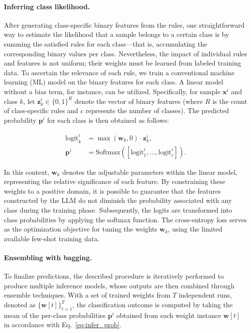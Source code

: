 \paragraph{Inferring class likelihood.} After generating class-specific binary features from the rules, one straightforward way to estimate the likelihood that a sample belongs to a certain class is by summing the satisfied rules for each class—that is, accumulating the corresponding binary values per class. Nevertheless, the impact of individual rules and features is not uniform; their weights must be learned from labeled training data. To ascertain the relevance of each rule, we train a conventional machine learning (ML) model on the binary features for each class. A linear model without a bias term, for instance, can be utilized. Specifically, for sample $\mathbf{x}^i$ and class $k$, let $\mathbf{z}_k^i \in \{0, 1\}^R$ denote the vector of binary features (where $R$ is the count of class-specific rules and $c$ represents the number of classes). The predicted probability $\mathbf{p}^i$ for each class is then obtained as follows:

\begin{align}
\text{logit}_k^i &= \max(\mathbf{w}_k, 0) \cdot \mathbf{z}_k^i, \nonumber \\
\mathbf{p}^i &= \text{Softmax}({[\text{logit}_{1}^i, ..., \text{logit}_{c}^i]}). \label{eq:infer_prob}
\end{align}

In this context, $\mathbf{w}_k$ denotes the adjustable parameters within the linear model, representing the relative significance of each feature. By constraining these weights to a positive domain, it is possible to guarantee that the features constructed by the LLM do not diminish the probability associated with any class during the training phase. Subsequently, the logits are transformed into class probabilities by applying the softmax function. The cross-entropy loss serves as the optimization objective for tuning the weights $\mathbf{w}_k$, using the limited available few-shot training data.

\vspace*{-0.12in}
\paragraph{Ensembling with bagging.} To finalize predictions, the described procedure is iteratively performed to produce multiple inference models, whose outputs are then combined through ensemble techniques. With a set of trained weights from $T$ independent runs, denoted as $\{\mathbf{w}[t]\}_{t=1}^T$, the classification outcome is computed by taking the mean of the per-class probabilities $\mathbf{p}^i$ obtained from each weight instance $\mathbf{w}[t]$ in accordance with Eq.~\ref{eq:infer_prob}.

